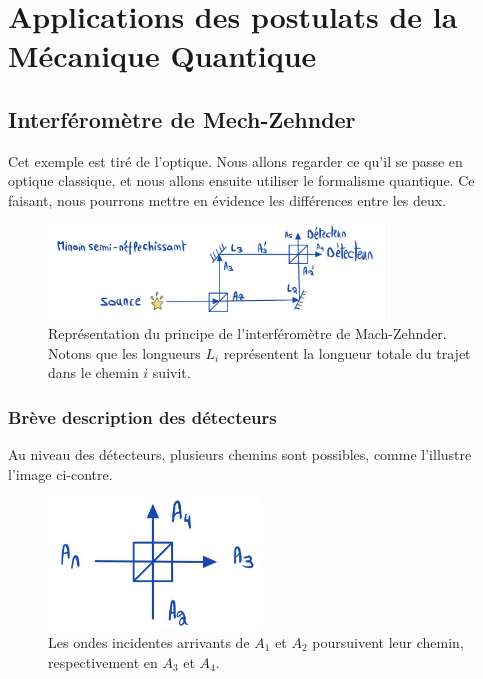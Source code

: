 \documentclass[../notesdecours.tex]{subfiles}
\begin{document}
\chapter{Applications des postulats de la Mécanique Quantique}

\section{Interféromètre de Mech-Zehnder}
Cet exemple est tiré de l'optique. Nous allons regarder ce qu'il se passe en optique classique, et nous allons ensuite utiliser le formalisme quantique. Ce faisant, nous pourrons mettre en évidence les différences entre les deux. \\

\begin{center}
    \begin{figure}[h]
    \centering
    \includegraphics[width=0.80\textwidth]{Mach-Zehnder.png}
    \caption{Représentation du principe de l'interféromètre de Mach-Zehnder. Notons que les longueurs $L_i$ représentent la longueur totale du trajet dans le chemin $i$ suivit.}
    \label{Mach-Zehnder}
    \end{figure}
\end{center}

\subsection{Brève description des détecteurs}
Au niveau des détecteurs, plusieurs chemins sont possibles, comme l'illustre l'image ci-contre.

\begin{center}
    \begin{figure}[h]
    \centering
    \includegraphics[width=0.50\textwidth]{bean.png}
    \caption{Les ondes incidentes arrivants de $A_1$ et $A_2$ poursuivent leur chemin, respectivement en $A_3$ et $A_4$.}
    \label{Interferometre}
    \end{figure}
\end{center}
\end{document}
